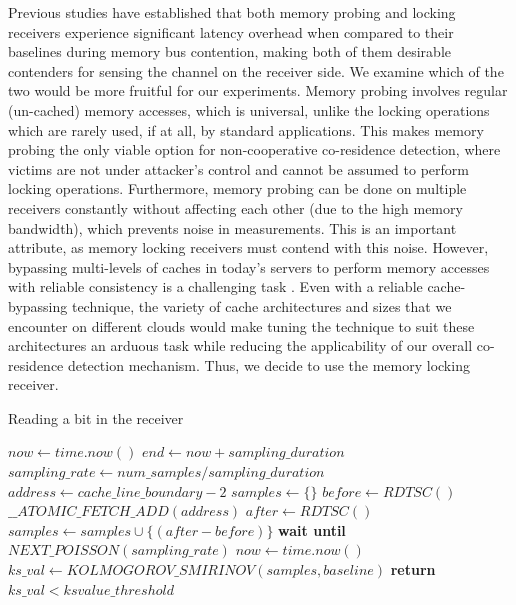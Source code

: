 Previous studies\cite{wuusenix2012,varadarajan2015} have established that both 
memory probing and locking receivers experience significant latency overhead when compared 
to their baselines during memory bus contention, making both of them desirable 
contenders for sensing the channel on the receiver side. We examine which of the two 
would be more fruitful for our experiments. Memory probing involves regular (un-cached) 
memory accesses, which is universal, unlike the locking operations which are rarely used, 
if at all, by standard applications. This makes memory probing the only viable option 
for non-cooperative co-residence detection, where 
victims are not under attacker's control and cannot be assumed to perform locking 
operations. Furthermore, memory probing can be done on multiple receivers 
constantly without affecting each other (due to the high memory bandwidth), which prevents 
noise in measurements. This is an important attribute, as memory locking receivers 
must contend with this noise. However, bypassing multi-levels of caches in today's servers 
to perform memory accesses with reliable consistency is a challenging task 
. Even with a reliable cache-bypassing technique, the 
variety of cache architectures and sizes that we encounter on different clouds 
would make tuning the technique to suit these architectures an arduous task while 
reducing the applicability of our overall co-residence detection mechanism. 
Thus, we decide to use the memory locking receiver.


\begin{algorithm}[!t]
\caption{Reading a bit in the receiver}
\label{alg:receiver}
\begin{algorithmic}[1]
\STATE $now \leftarrow  time.now()$
\STATE $end \leftarrow now + sampling\_duration$
\STATE $sampling\_rate \leftarrow num\_samples / sampling\_duration$
\STATE $address \leftarrow cache\_line\_boundary-2$
\STATE $samples \leftarrow \{\} $
    \STATE $before \leftarrow RDTSC()$
    \STATE $\_\_ATOMIC\_FETCH\_ADD(address)$
    \STATE $after \leftarrow RDTSC()$
    \STATE $samples \leftarrow samples \cup \{(after-before)\}$
    \STATE \textbf{wait until} $NEXT\_POISSON(sampling\_rate)$
    \STATE $now \leftarrow  time.now()$
\ENDWHILE
\STATE $ks\_val \leftarrow KOLMOGOROV\_SMIRINOV(samples, baseline)$
\STATE \textbf{return} $ks\_val < ksvalue\_threshold$
\end{algorithmic}
\end{algorithm}


